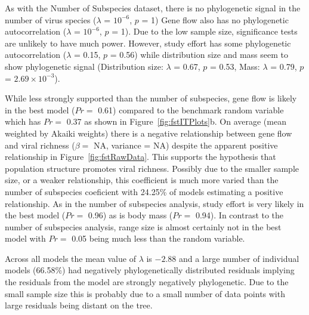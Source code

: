 As with the Number of Subspecies dataset, there is no phylogenetic signal in the number of virus species ($\lambda$ = \ensuremath{10^{-6}}, $p$ = 1)
Gene flow also has no phylogenetic autocorrelation ($\lambda$ = \ensuremath{10^{-6}}, $p$ = 1).
Due to the low sample size, significance tests are unlikely to have much power.
However, study effort has some phylogenetic autocorrelation ($\lambda$ = 0.15, $p$ = 0.56) while distribution size and mass seem to show phylogenetic signal (Distribution size: $\lambda$ = 0.67, $p$ = 0.53, Mass: $\lambda$ = 0.79, $p$ = \ensuremath{2.69\times 10^{-3}}).



While less strongly supported than the number of subspecies, gene flow is likely in the best model ($Pr = $ 0.61) compared to the benchmark random variable which has $Pr = $ 0.37 as shown in Figure~\ref{fig:fstITPlots}b.
On average (mean weighted by Akaiki weights) there is a negative relationship between gene flow and viral richness ($\beta = $ NA, variance = NA) despite the apparent positive relationship in Figure~\ref{fig:fstRawData}.
This supports the hypothesis that population structure promotes viral richness.
Possibly due to the smaller sample size, or a weaker relationship, this coefficient is much more varied than the number of subspecies coeficient with 24.25\% of models estimating a positive relationship.
As in the number of subspecies analysis, study effort is very likely in the best model ($Pr = $ 0.96) as is body mass ($Pr = $ 0.94).
In contrast to the number of subspecies analysis, range size is almost certainly not in the best model with $Pr = $ 0.05 being much less than the random variable.

Across all models the mean value of $\lambda$ is \ensuremath{-2.88} and a large number of individual models (66.58\%)  had negatively phylogenetically distributed residuals implying the residuals from the model are strongly negatively phylogenetic.
Due to the small sample size this is probably due to a small number of data points with large residuals being distant on the tree.









